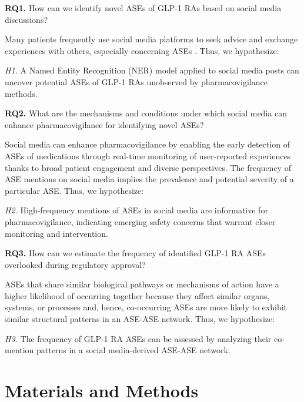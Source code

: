 \documentclass[referee,bst/sn-basic]{sn-jnl}%
\theoremstyle{thmstyletwo}%
\theoremstyle{thmstylethree}%
\begin{document}
\textbf{RQ1.} 
How can we identify novel ASEs of GLP-1 RAs based on social media discussions?

Many patients frequently use social media platforms to seek advice and exchange experiences with others, especially concerning ASEs \cite{ozurumba2022multi,chen2021social}.
Thus, we hypothesize:

\textit{H1.} 
A Named Entity Recognition (NER) model applied to social media posts can uncover potential ASEs of GLP-1 RAs unobserved by pharmacovigilance methods.

\textbf{RQ2.} 
What are the mechanisms and conditions under which social media can enhance pharmacovigilance for identifying novel ASEs?

Social media can enhance pharmacovigilance by enabling the early detection of ASEs of medications through real-time monitoring of user-reported experiences \cite{lee2021use} thanks to broad patient engagement and diverse perspectives.
The frequency of ASE mentions on social media implies the prevalence and potential severity of a particular ASE. 
Thus, we hypothesize:

\textit{H2.}
High-frequency mentions of ASEs in social media are informative for pharmacovigilance, indicating emerging safety concerns that warrant closer monitoring and intervention.

\textbf{RQ3.} 
How can we estimate the frequency of identified GLP-1 RA ASEs overlooked during regulatory approval?

ASEs that share similar biological pathways or mechanisms of action have a higher likelihood of occurring together \cite{cabral2023gastrointestinal,zhang2023glp}
because they affect similar organs, systems, or processes and, hence, co-occurring ASEs are more likely to exhibit similar structural patterns in an ASE-ASE network. 
Thus, we hypothesize:

\textit{H3.} 
The frequency of GLP-1 RA ASEs can be assessed by analyzing their co-mention patterns in a social media-derived ASE-ASE network.



\section{Materials and Methods}
\label{sec: material}
\end{document}
